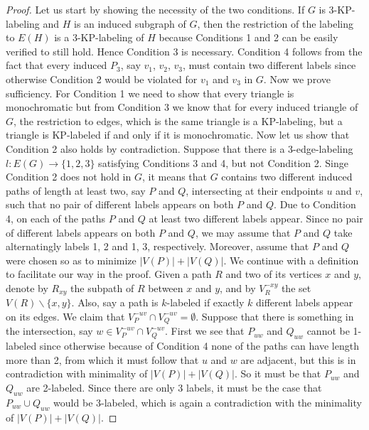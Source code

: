 \documentclass[12pt,a4paper,titlepage,openany]{report}
\begin{document}
\begin{proof}
Let us start by showing the necessity of the two conditions. If $G$ is 3-KP-labeling and $H$ is an induced subgraph of $G$, then the restriction of the labeling to $E(H)$ is a 3-KP-labeling of $H$ because Conditions 1 and 2 can be easily verified to still hold. Hence Condition 3 is necessary. Condition 4 follows from the fact that every induced $P_3$, say $v_1$, $v_2$, $v_3$, must contain two different labels since otherwise Condition 2 would be violated for $v_1$ and $v_3$ in $G$.\newline\medskip 
Now we prove sufficiency. For Condition 1 we need to show that every triangle is monochromatic but from Condition 3 we know that for every induced triangle of $G$, the restriction to edges, which is the same triangle is a KP-labeling, but a triangle is KP-labeled if and only if it is monochromatic.\newline
Now let us show that Condition 2 also holds by contradiction.\newline
Suppose  that there is a 3-edge-labeling $l:E(G)\rightarrow \{1,2,3\}$ satisfying Conditions 3 and 4, but not Condition 2. Singe Condition 2 does not hold in $G$, it means that $G$ contains two different induced paths of length at least two, say $P$ and $Q$, intersecting at their endpoints $u$ and $v$, such that no pair of different labels appears on both $P$ and $Q$.\newline
Due to Condition 4, on each of the paths $P$ and $Q$ at least two different labels appear. Since no pair of different labels appears on both $P$ and $Q$, we may assume that $P$ and $Q$ take alternatingly labels 1, 2 and 1, 3, respectively. Moreover, assume that $P$ and $Q$ were chosen so as to minimize $|V(P)|+|V(Q)|$.\newline
We continue with a definition to facilitate our way in the proof. Given a path $R$ and two of its vertices $x$ and $y$, denote by $R_{xy}$ the subpath of $R$ between
$x$ and $y$, and by $V_R^{-xy}$ the set $V(R)\backslash \{x,y\}$. Also, say a path is $k$-labeled if exactly $k$
different labels appear on its edges.\newline
We claim that $V_P^{-uv} \cap V_Q^{-uv} = \emptyset$. Suppose that there is something in the intersection, say $w\in V_P^{-uv} \cap V_Q^{-uv}$. First we see that $P_{uw}$ and $Q_{uw}$ cannot be 1-labeled since otherwise because of Condition 4 none of the paths can have length more than 2, from which it must follow that $u$ and $w$ are adjacent, but this is in contradiction with minimality of $|V(P)|+|V(Q)|$. So it must be that $P_{uw}$ and $Q_{uw}$ are 2-labeled. Since there are only 3 labels, it must be the case that $P_{uw}\cup Q_{uw}$ would be 3-labeled, which is again a contradiction with the minimality of $|V(P)|+|V(Q)|$. \newline

\end{proof}
\end{document}
